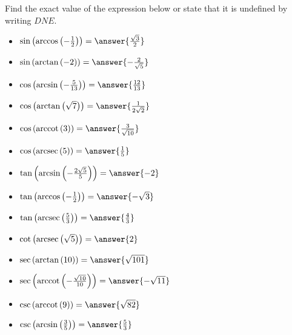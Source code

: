 \documentclass{ximera}
\author{Nela Lakos \and Kyle Parsons}
\begin{document}
\begin{exercise}

Find the exact value of the expression below or state that it is undefined by writing $DNE$.

\begin{itemize}
\item $\sin\left(\arccos\left(-\frac{1}{2}\right)\right) = \answer{\frac{\sqrt{3}}{2}}$
\item $\sin\left(\arctan\left(-2\right)\right) = \answer{-\frac{2}{\sqrt{5}}}$
\item $\cos\left(\arcsin\left(-\frac{5}{13}\right)\right) = \answer{\frac{12}{13}}$
\item $\cos\left(\arctan\left(\sqrt{7}\right)\right) = \answer{\frac{1}{2\sqrt{2}}}$
\item $\cos\left(\text{arccot}\left(3\right)\right) = \answer{\frac{3}{\sqrt{10}}}$
\item $\cos\left(\text{arcsec}\left(5\right)\right) = \answer{\frac{1}{5}}$
\item $\tan\left(\arcsin\left(-\frac{2\sqrt{5}}{5}\right)\right) = \answer{-2}$
\item $\tan\left(\arccos\left(-\frac{1}{2}\right)\right) = \answer{-\sqrt{3}}$
\item $\tan\left(\text{arcsec}\left(\frac{5}{3}\right)\right) = \answer{\frac{4}{3}}$
\item $\cot\left(\text{arcsec}\left(\sqrt{5}\right)\right) = \answer{2}$
\item $\sec\left(\arctan\left(10\right)\right) = \answer{\sqrt{101}}$
\item $\sec\left(\text{arccot}\left(-\frac{\sqrt{10}}{10}\right)\right) = \answer{-\sqrt{11}}$
\item $\csc\left(\text{arccot}\left(9\right)\right) = \answer{\sqrt{82}}$
\item $\csc\left(\arcsin\left(\frac{3}{5}\right)\right) = \answer{\frac{5}{3}}$
\end{itemize}

\end{exercise}
\end{document}
